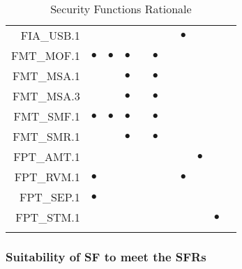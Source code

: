 \documentclass[12pt,english]{scrbook}
\newcommand{\oh}{$\bullet$}
\begin{document}
\begin{longtable}{r|R|R|R|R|R|R|R|R|R|R}
FIA\_USB.1          &            &                &               &          &               &                        &  \oh               &                 &                    \\   
FMT\_MOF.1          & \oh        &  \oh           &  \oh          &          & \oh           &                        &                    &                 &                    \\   
FMT\_MSA.1          &            &                &  \oh          &          & \oh           &                        &                    &                 &                    \\   
FMT\_MSA.3          &            &                &  \oh          &          & \oh           &                        &                    &                 &                    \\   
FMT\_SMF.1          & \oh        &  \oh           &  \oh          &          & \oh           &                        &                    &                 &                    \\   
FMT\_SMR.1          &            &                &  \oh          &          & \oh           &                        &                    &                 &                    \\   
FPT\_AMT.1          &            &                &               &          &               &                        &                    &    \oh          &                    \\   
FPT\_RVM.1          & \oh        &                &               &          &               &                        &  \oh               &                 &                    \\   
FPT\_SEP.1          &  \oh       &                &               &          &               &                        &                    &                 &                    \\ 
FPT\_STM.1          &            &                &               &          &               &                        &                    &                 &   \oh              \\       
    \bottomrule
    \caption{Security Functions Rationale} 

\end{longtable}

\subsubsection{Suitability of SF to meet the SFRs}
\end{document}
